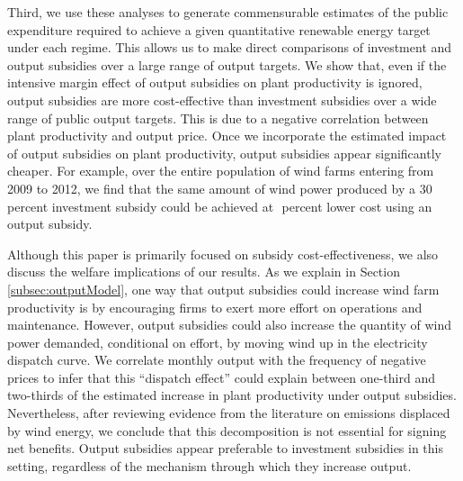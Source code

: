 \documentclass[12pt]{article}
\begin{document}
Third, we use these analyses to generate commensurable estimates of the public expenditure required to achieve a given quantitative renewable energy target under each regime. This allows us to make direct comparisons of investment and output subsidies over a large range of output targets. We show that, even if the intensive margin effect of output subsidies on plant productivity is ignored, output subsidies are more cost-effective than investment subsidies over a wide range of public output targets. This is due to a negative correlation between plant productivity and output price. Once we incorporate the estimated impact of output subsidies on plant productivity, output subsidies appear significantly cheaper. For example, over the entire population of wind farms entering from 2009 to 2012, we find that the same amount of wind power produced by a 30 percent investment subsidy could be achieved at $$ percent lower cost using an output subsidy. 

Although this paper is primarily focused on subsidy cost-effectiveness, we also discuss the welfare implications of our results. As we explain in Section \ref{subsec:outputModel}, one way that output subsidies could increase wind farm productivity is by encouraging firms to exert more effort on operations and maintenance. However, output subsidies could also increase the quantity of wind power demanded, conditional on effort, by moving wind up in the electricity dispatch curve. We correlate monthly output with the frequency of negative prices to infer that this ``dispatch effect'' could explain between one-third and two-thirds of the estimated increase in plant productivity under output subsidies. Nevertheless, after reviewing evidence from the literature on emissions displaced by wind energy, we conclude that this decomposition is not essential for signing net benefits. Output subsidies appear preferable to investment subsidies in this setting, regardless of the mechanism through which they increase output.
\end{document}
